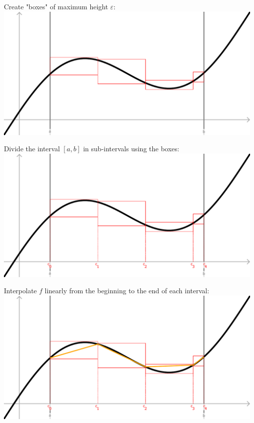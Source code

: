 \documentclass[]{article}
\begin{document}
Create "boxes" of maximum height $\varepsilon$:\newline
\includegraphics[width=\linewidth]{plot_2}
\vspace{1cm}

\newpage
Divide the interval $\left[ a,b \right]$ in sub-intervals using the boxes:\newline
\includegraphics[width=\linewidth]{plot_3}
\vspace{1cm}

Interpolate $f$ linearly from the beginning to the end of each interval:\newline
\includegraphics[width=\linewidth]{plot_4}
\vspace{1cm}
\end{document}
